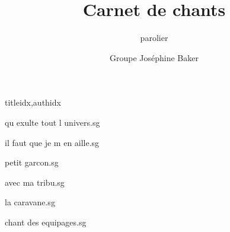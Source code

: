 \documentclass[
    ]{article}
\title{Carnet de chants}
\author{Groupe Joséphine Baker}
\subtitle{parolier}
\newcommand{\phantomsection}{}
\begin{document}
\maketitle

%
%

\ifdiagrampage
   \phantomsection
   \chords
\fi
\setcounter{songnum}{1}%

\phantomsection
{}

\begin{songs}{titleidx,authidx}

{qu exulte tout l univers.sg}


{il faut que je m en aille.sg}


{petit garcon.sg}


{avec ma tribu.sg}


{la caravane.sg}


{chant des equipages.sg}



\end{songs}
\end{document}
